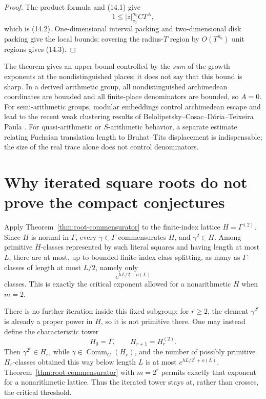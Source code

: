 \documentclass[11pt,reqno]{amsart}
\theoremstyle{definition}
\theoremstyle{remark}
\newcommand{\Comm}{\operatorname{Comm}}
\begin{document}
\begin{proof}
The product formula and (14.1) give
\[
 1\le |z|_{v_0}^{n_0}CT^A,
\]
which is (14.2).  One-dimensional interval packing and two-dimensional disk
packing give the local bounds; covering the radius-\(T\) region by
\(O(T^{n_0})\) unit regions gives (14.3).
\end{proof}

The theorem gives an upper bound controlled by the \emph{sum} of the growth
exponents at the nondistinguished places; it does not say that this bound is
sharp.  In a derived arithmetic group, all nondistinguished archimedean
coordinates are bounded and all finite-place denominators are bounded, so
\(A=0\).  For semi-arithmetic groups,
modular embeddings control archimedean escape and lead to the recent weak
clustering results of Belolipetsky--Cosac--D\'oria--Teixeira Paula
\cite{BCDPmultiplicities}.  For quasi-arithmetic or \(S\)-arithmetic behavior, a separate
estimate relating Fuchsian translation length to Bruhat--Tits displacement
is indispensable; the size of the real trace alone does not control
denominators.

\section{Why iterated square roots do not prove the compact conjectures}

Apply Theorem~\ref{thm:root-commensurator} to the finite-index lattice
\(H=\Gamma^{(2)}\).  Since \(H\) is normal in \(\Gamma\), every
\(\gamma\in\Gamma\) commensurates \(H\), and \(\gamma^2\in H\).  Among
primitive \(H\)-classes represented by such literal squares and having length
at most \(L\), there are at most, up to bounded finite-index class splitting,
as many as \(\Gamma\)-classes of length at most \(L/2\), namely only
\[
 e^{hL/2+o(L)}
\]
classes.  This is exactly the critical exponent allowed for a nonarithmetic
\(H\) when \(m=2\).

There is no further iteration inside this fixed subgroup: for \(r\ge2\), the
element \(\gamma^{2^r}\) is already a proper power in \(H\), so it is not
primitive there.  One may instead define the characteristic tower
\[
 H_0=\Gamma,\qquad H_{r+1}=H_r^{(2)}.
\]
Then \(\gamma^{2^r}\in H_r\), while \(\gamma\in\Comm_G(H_r)\), and the number
of possibly primitive \(H_r\)-classes obtained this way below length \(L\) is
at most \(e^{hL/2^r+o(L)}\).  Theorem~\ref{thm:root-commensurator} with
\(m=2^r\) permits exactly that exponent for a nonarithmetic lattice.  Thus the
iterated tower stays at, rather than crosses, the critical threshold.
\end{document}
